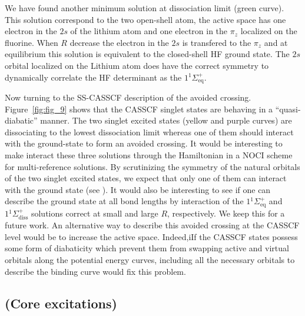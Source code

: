 \documentclass[aps,prb,reprint,showkeys,superscriptaddress]{revtex4-1}
\begin{document}
We have found another minimum solution at dissociation limit (green curve).
This solution correspond to the two open-shell atom, the active space has one electron in the $2s$ of the lithium atom and one electron in the $\pi_z$ localized on the fluorine.
When $R$ decrease the electron in the $2s$ is transfered to the $\pi_z$ and at equilibrium this solution is equivalent to the closed-shell HF ground state.
The $2s$ orbital localized on the Lithium atom does have the correct symmetry to dynamically correlate the HF determinant as the $1 {}^1\Sigma^+_{\text{eq}}$.

Now turning to the SS-CASSCF description of the avoided crossing.
Figure~\ref{fig:fig_9} shows that the CASSCF singlet states are behaving in a ``quasi-diabatic'' manner.
The two singlet excited states (yellow and purple curves) are dissociating to the lowest dissociation limit whereas one of them should interact with the ground-state to form an avoided crossing.
It would be interesting to make interact these three solutions through the Hamiltonian in a NOCI scheme for multi-reference solutions.
By scrutinizing the symmetry of the natural orbitals of the two singlet excited states, we expect that only one of them can interact with the ground state (see \SupInf).
It would also be interesting to see if one can describe the ground state at all bond lengths by interaction of the $1 {}^1\Sigma^+_{\text{eq}}$ and $1 {}^1\Sigma^+_{\text{diss}}$ solutions correct at small and large $R$, respectively.
We keep this for a future work.
An alternative way to describe this avoided crossing at the CASSCF level would be to increase the active space.
Indeed,iIf the CASSCF states possess some form of diabaticity which prevent them from swapping active and virtual orbitals along the potential energy curves, including all the necessary orbitals to describe the binding curve would fix this problem. 

\subsection{(Core excitations)}
\label{sec:core}
\end{document}

